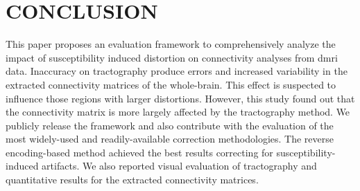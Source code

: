 \section{CONCLUSION}

This paper proposes an evaluation framework to
comprehensively analyze the impact of susceptibility
induced distortion on connectivity analyses from \gls*{dmri}
data. Inaccuracy on tractography produce errors
and increased variability in the extracted connectivity 
matrices of the whole-brain. This effect is suspected
to influence those regions with larger distortions.
However, this study found out that the connectivity
matrix is more largely affected by the tractography method.
We publicly release the framework and also contribute
with the evaluation of the most widely-used and
readily-available correction methodologies. 
The reverse encoding-based method achieved the
best results correcting for susceptibility-induced 
artifacts. We also reported visual evaluation of 
tractography and quantitative results for the 
extracted connectivity matrices.